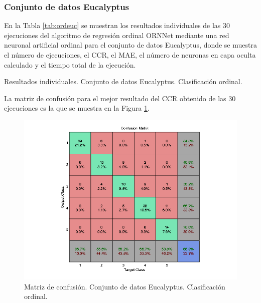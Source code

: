 			\subsubsection{Conjunto de datos Eucalyptus}
			
			En la Tabla \ref{tab:ordeuc} se muestran los resultados individuales de las 30 ejecuciones del algoritmo de regresión ordinal ORNNet mediante una red neuronal artificial ordinal para el conjunto de datos Eucalyptus, donde se muestra el número de ejecuciones, el CCR, el MAE, el número de neuronas en capa oculta calculado y el tiempo total de la ejecución.\\
			
			\begin{table}[!htbp]
				\centering
				\caption{Resultados individuales. Conjunto de datos Eucalyptus. Clasificación ordinal.}
				\label{tab:ordeuc}
			\end{table}
			
			La matriz de confusión para el mejor resultado del CCR obtenido de las 30 ejecuciones es la que se muestra en la Figura \ref{fig:ordeuc}.
			
			\begin{figure}[htbp]
				\centering
				\includegraphics[scale=0.8]{../src/results/ordinal/eucalyptus_mc1.png}
				\caption{Matriz de confusión. Conjunto de datos Eucalyptus. Clasificación ordinal.}
				\label{fig:ordeuc}
			\end{figure}
			
